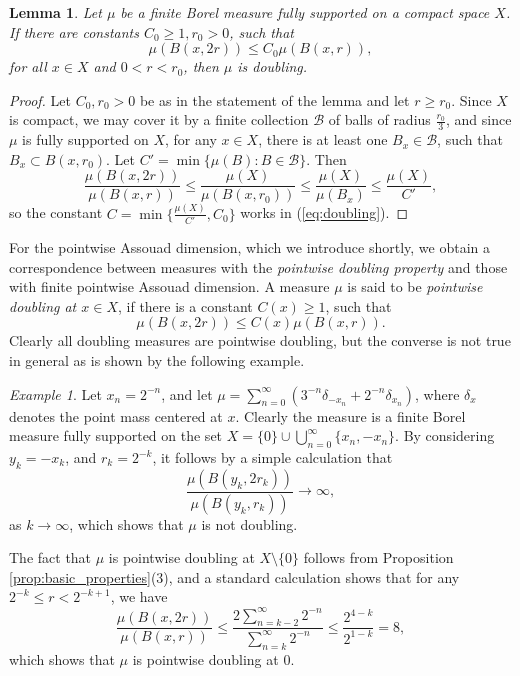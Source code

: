 \documentclass{PRM}
\theoremstyle{plain}
\newtheorem{lemma}[thm]{Lemma}
\theoremstyle{definition}
\theoremstyle{remark}
\newtheorem{example}[thm]{Example}
\begin{document}
\begin{lemma}\label{lemma:doubling_small_r}
Let $\mu$ be a finite Borel measure fully supported on a compact space $X$. If there are constants $C_0\geq 1,r_0>0$, such that
\begin{equation*}
    \mu(B(x,2r))\leq C_0\mu(B(x,r)),
\end{equation*}
for all $x\in X$ and $0<r<r_0$, then $\mu$ is doubling.
\end{lemma}
\begin{proof}
Let $C_0,r_0>0$ be as in the statement of the lemma and let $r\geq r_0$. Since $X$ is compact, we may cover it by a finite collection $\mathcal{B}$ of balls of radius $\frac{r_0}{3}$, and since $\mu$ is fully supported on $X$, for any $x\in X$, there is at least one $B_x\in\mathcal{B}$, such that $B_x\subset B(x,r_0)$. Let $C'=\min\{\mu(B)\colon B\in\mathcal{B}\}$. Then
\begin{equation*}
    \frac{\mu(B(x,2r))}{\mu(B(x,r))}\leq\frac{\mu(X)}{\mu(B(x,r_0))}\leq \frac{\mu(X)}{\mu(B_x)}\leq \frac{\mu(X)}{C'},
\end{equation*}
so the constant $C=\min\{\frac{\mu(X)}{C'},C_0\}$ works in (\ref{eq:doubling}).
\end{proof}

For the pointwise Assouad dimension, which we introduce shortly, we obtain a correspondence between measures with the \emph{pointwise doubling property} and those with finite pointwise Assouad dimension. A measure $\mu$ is said to be \emph{pointwise doubling at $x\in X$}, if there is a constant $C(x)\geq 1$, such that
\begin{equation*}
    \mu(B(x,2r))\leq C(x)\mu(B(x,r)).
\end{equation*}
Clearly all doubling measures are pointwise doubling, but the converse is not true in general as is shown by the following example.

\begin{example}\label{ex:loc_not_glob_doubling}
    Let $x_n=2^{-n}$, and let $\mu=\sum_{n=0}^{\infty}(3^{-n}\delta_{-x_n}+2^{-n}\delta_{x_n})$, where $\delta_x$ denotes the point mass centered at $x$. Clearly the measure is a finite Borel measure fully supported on the set $X=\{0\}\cup\bigcup_{n=0}^{\infty}\{x_n,-x_n\}$. By considering $y_k=-x_k$, and $r_k=2^{-k}$, it follows by a simple calculation that
    \begin{equation*}
        \frac{\mu(B(y_k,2r_k))}{\mu(B(y_k,r_k))}\to \infty,
    \end{equation*}
    as $k\to\infty$, which shows that $\mu$ is not doubling.
    
    The fact that $\mu$ is pointwise doubling at $X\setminus\{0\}$ follows from Proposition \ref{prop:basic_properties}(3), and a standard calculation shows that for any  $2^{-k}\leq r < 2^{-k+1}$, we have
    \begin{equation*}
        \frac{\mu(B(x,2r))}{\mu(B(x,r))}\leq \frac{2\sum_{n=k-2}^{\infty}2^{-n}}{\sum_{n=k}^{\infty}2^{-n}}\leq\frac{2^{4-k}}{2^{1-k}}=8,
    \end{equation*}
    which shows that $\mu$ is pointwise doubling at $0$.
\end{example}
\end{document}
